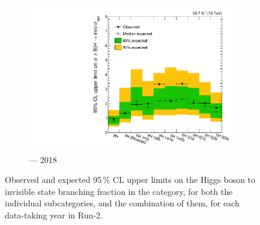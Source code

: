 \begin{figure}[htbp]
    \begin{subfigure}[b]{0.45\textwidth}
        \includegraphics[width=\textwidth]{chapters/higgstoinv/figures/limits/ttH/limit_2018_ttH.pdf}
        \caption{\ttH --- 2018}
    \end{subfigure}
    \caption[Observed and expected 95\,\% CL upper limits on the Higgs boson to invisible state branching fraction in the \ttH category, for both the individual subcategories, and the combination of them, for each data-taking year in Run-2]{Observed and expected 95\,\% CL upper limits on the Higgs boson to invisible state branching fraction in the \ttH category, for both the individual subcategories, and the combination of them, for each data-taking year in Run-2.}
    \label{fig:htoinv_limit_ttH_per_year}
\end{figure}

